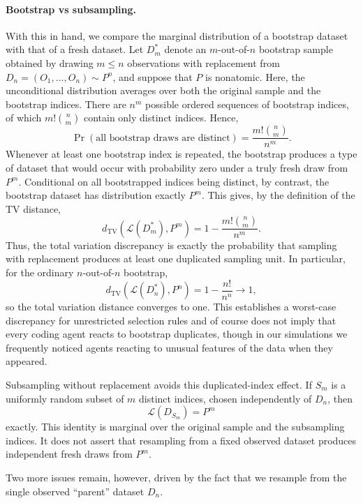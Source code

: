 \documentclass[10pt]{article}
\begin{document}
\paragraph{Bootstrap vs subsampling.}
With this in hand, we compare the marginal distribution of a bootstrap dataset with that of a fresh dataset. Let $D_m^*$ denote an $m$-out-of-$n$ bootstrap sample obtained by drawing $m\leq n$ observations with replacement from $D_n=(O_1,\ldots,O_n)\sim P^n$, and suppose that $P$ is nonatomic. Here, the unconditional distribution averages over both the original sample and the bootstrap indices. There are $n^m$ possible ordered sequences of bootstrap indices, of which $m!\binom{n}{m}$ contain only distinct indices. Hence,
\[
\Pr\left(\text{all bootstrap draws are distinct}\right) =  \frac{m!\binom{n}{m}}{n^m}.
\]
Whenever at least one bootstrap index is repeated, the bootstrap produces a type of dataset that would occur with probability zero under a truly fresh draw from $P^m$. Conditional on all bootstrapped indices being distinct, by contrast, the bootstrap dataset has distribution exactly $P^m$. This gives, by the definition of the TV distance,
\begin{equation} \label{eq:TV_bootstrap}
d_{\mathrm{TV}}
\left(
\mathcal L(D_m^*),
P^m
\right)
=
1-\frac{m!\binom{n}{m}}{n^m}.
\end{equation}
Thus, the total variation discrepancy is exactly the probability that sampling with replacement produces at least one duplicated sampling unit. In particular, for the ordinary $n$-out-of-$n$ bootstrap,
\[
d_{\mathrm{TV}}
\left(
\mathcal L(D_n^*),
P^n
\right)
=
1-\frac{n!}{n^n}
\longrightarrow 1,
\]
so the total variation distance converges to one. This establishes a worst-case discrepancy for unrestricted selection rules and of course does not imply that every coding agent reacts to bootstrap duplicates, though in our simulations we frequently noticed agents reacting to unusual features of the data when they appeared.

Subsampling without replacement avoids this duplicated-index effect. If $S_m$ is a uniformly random subset of $m$ distinct indices, chosen independently of $D_n$, then
\[
\mathcal L(D_{S_m})=P^m
\]
exactly. This identity is marginal over the original sample and the subsampling indices. It does not assert that resampling from a fixed observed dataset produces independent fresh draws from $P^m$.

Two more issues remain, however, driven by the fact that we resample from the single observed ``parent'' dataset $D_n$.
\end{document}

